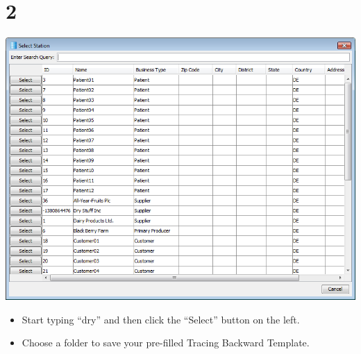 \documentclass[10pt]{beamer}
\begin{document}
\section{2}
\begin{frame}
	\begin{center}
			\includegraphics[height=0.6\textheight]{2.png}
	\end{center}
	\begin{itemize}
		\item Start typing ``dry'' and then click the ``Select'' button on the left.
		\item Choose a folder to save your pre-filled Tracing Backward Template.
	\end{itemize}
\end{frame}
\end{document}
